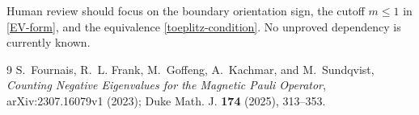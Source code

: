 \documentclass[11pt]{article}
\begin{document}
Human review should focus on the boundary orientation sign, the cutoff
$m\leq1$ in \eqref{EV-form}, and the equivalence
\eqref{toeplitz-condition}.  No unproved dependency is currently known.

\begin{thebibliography}{9}
S.~Fournais, R.~L. Frank, M.~Goffeng, A.~Kachmar, and M.~Sundqvist,
\emph{Counting Negative Eigenvalues for the Magnetic Pauli Operator},
arXiv:2307.16079v1 (2023); Duke Math. J. \textbf{174} (2025), 313--353.
\end{thebibliography}
\end{document}
